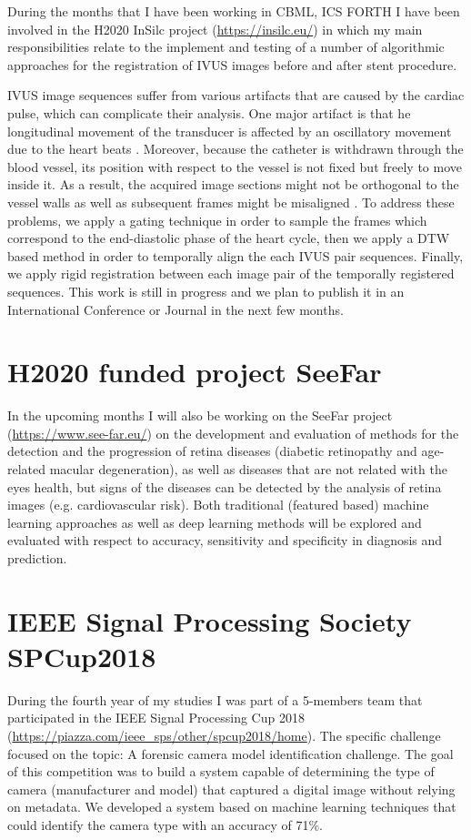 \documentclass{article}
\begin{document}
During the months that I have been working in CBML, ICS FORTH I have been involved in the H2020 InSilc project (\url{https://insilc.eu/}) in which my main responsibilities relate to the implement and testing of a number of algorithmic approaches for the registration of IVUS images before and after stent procedure.

IVUS image sequences suffer from various artifacts that are caused by the cardiac pulse, which can complicate their analysis. One major artifact is that he longitudinal movement of the transducer is affected by an oscillatory movement due to the heart beats \cite{alberti2012automatic}. Moreover, because the catheter is withdrawn through the blood vessel, its position with respect to the vessel is not fixed but freely to move inside it. As a result, the acquired image sections might not be orthogonal to the vessel walls \cite{gatta2008robust} as well as subsequent frames might be misaligned \cite{alberti2012automatic}. To address these problems, we apply a gating technique in order to sample the frames which correspond to the end-diastolic phase of the heart cycle, then we apply a DTW based method in order to temporally align the each IVUS pair sequences. Finally, we apply rigid registration between each image pair of the temporally registered sequences. This work is still in progress and we plan to publish it in an International Conference or Journal in the next few months.


\section{H2020 funded project SeeFar}

In the upcoming months I will also be working on the SeeFar project (\url{https://www.see-far.eu/}) on the development and evaluation of methods for the detection and the progression of retina diseases (diabetic retinopathy and  age-related macular degeneration), as well as diseases that are not related with the eyes health, but signs of the diseases can be detected by the analysis of retina images (e.g. cardiovascular risk). Both traditional (featured based) machine learning approaches as well as deep learning methods will be explored and evaluated  with respect to accuracy, sensitivity and specificity in diagnosis and prediction.

\section{IEEE Signal Processing Society SPCup2018}

During the fourth year of my studies I was part of a 5-members team that participated in the IEEE Signal Processing Cup 2018 (\url{https://piazza.com/ieee_sps/other/spcup2018/home}). The specific challenge focused on the topic: A forensic camera model identification challenge. The goal of this competition was to build a system capable of determining the type of camera (manufacturer and model) that captured a digital image without relying on metadata. We developed a system based on machine learning techniques that could identify the camera type with an accuracy of 71\%.



\end{document}
